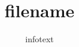 \documentclass[a4paper,10pt]{article}
\title{filename}
\author{infotext}
\date{}
\begin{document}
\maketitle

\renewcommand{\abstractname}{Conversation details}
\end{document}
